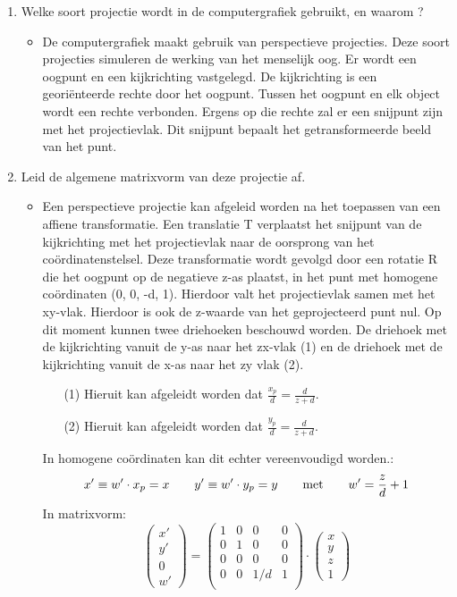 \documentclass{report}
\newcommand{\vraag}[2]{
	\item #1
	
	#2
}
\begin{document}
	\begin{enumerate}
	\vraag{Welke soort projectie wordt in de computergrafiek gebruikt, en waarom ?}{ 	
		\begin{itemize}
			\item De computergrafiek maakt gebruik van perspectieve projecties. Deze soort projecties simuleren de werking van het menselijk oog. Er wordt een oogpunt en een kijkrichting vastgelegd. De kijkrichting is een georiënteerde rechte door het oogpunt. Tussen het oogpunt en elk object wordt een rechte verbonden. Ergens op die rechte zal er een snijpunt zijn met het projectievlak. Dit snijpunt bepaalt het getransformeerde beeld van het punt.
		\end{itemize} 
	}
	
	\vraag{Leid de algemene matrixvorm van deze projectie af. \accentuate{(§2.2)}}{
		\begin{itemize} 
			\item Een perspectieve projectie kan afgeleid worden na het toepassen van een affiene transformatie. Een translatie T verplaatst het snijpunt van de kijkrichting met het projectievlak naar de oorsprong van het coördinatenstelsel. Deze transformatie wordt gevolgd door een rotatie R die het oogpunt op de negatieve z-as plaatst, in het punt met homogene coördinaten (0, 0, -d, 1). Hierdoor valt het projectievlak samen met het xy-vlak. Hierdoor is ook de z-waarde van het geprojecteerd punt nul. Op dit moment kunnen twee driehoeken beschouwd worden. De driehoek met de kijkrichting vanuit de y-as naar het zx-vlak (1) en de driehoek met de kijkrichting vanuit de x-as naar het zy vlak (2).
			\begin{enumerate}
				\item[(1)] Hieruit kan afgeleidt worden dat $\frac{x_p}{d} = \frac{d}{z + d}$.
				\item[(2)] Hieruit kan afgeleidt worden dat $\frac{y_p}{d} = \frac{d}{z + d}$.
			\end{enumerate}
		In homogene coördinaten kan dit echter vereenvoudigd worden.:
		$$x' \equiv w'\cdot x_p = x \qquad y' \equiv w'\cdot y_p = y \qquad \hbox{met} \qquad w' = \frac{z}{d} + 1$$
		In matrixvorm:
		$$
			\begin{pmatrix}
			 x' \\ y' \\ 0 \\ w'
			\end{pmatrix}
			=
			\begin{pmatrix}
				1 & 0 & 0 & 0 \\
				0 & 1 & 0 & 0 \\
				0 & 0 & 0 & 0 \\
				0 & 0 & 1/d & 1 \\
			\end{pmatrix} 
			\cdot
			\begin{pmatrix}
			x \\ y \\ z \\ 1
			\end{pmatrix}
		$$
		

\end{itemize}}
\end{enumerate}
\end{document}
